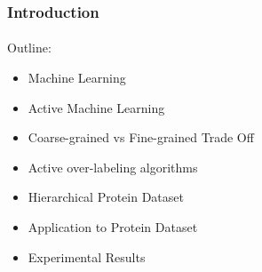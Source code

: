 \documentclass{beamer}
\begin{document}
\begin{frame}
    \frametitle{Introduction}    %
    \framesubtitle{}
\par Outline:
\begin{itemize}
  \item Machine Learning
  \item Active Machine Learning
  \item Coarse-grained vs Fine-grained Trade Off
  \item Active over-labeling algorithms
  \item Hierarchical Protein Dataset
  \item Application to Protein Dataset
  \item Experimental Results
\end{itemize}
\end{frame}
\end{document}
